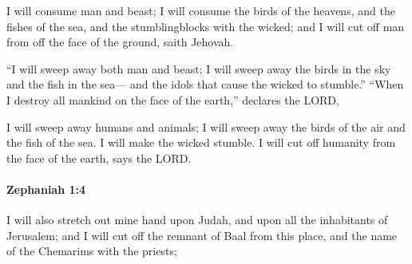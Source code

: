 			\begin{versebox}
					\item[BHS] 
					\item[LXX] 
					\item[ASV] I will consume man and beast; I will consume the birds of the heavens, and the fishes of the sea, and the stumblingblocks with the wicked; and I will cut off man from off the face of the ground, saith Jehovah.
					\item[NIV] “I will sweep away both man and beast; I will sweep away the birds in the sky and the fish in the sea— and the idols that cause the wicked to stumble.” “When I destroy all mankind on the face of the earth,” declares the LORD,
					\item[NRSV] I will sweep away humans and animals; I will sweep away the birds of the air and the fish of the sea. I will make the wicked stumble. I will cut off humanity from the face of the earth, says the LORD.
			\end{versebox}

		\paragraph{Zephaniah 1:4} %
			\label{ZEPHANIAH-1-4}

			I will also stretch out mine hand upon Judah, and upon all the inhabitants of Jerusalem; and I will cut off the remnant of Baal from this place, and the name of the Chemarims with the priests;

